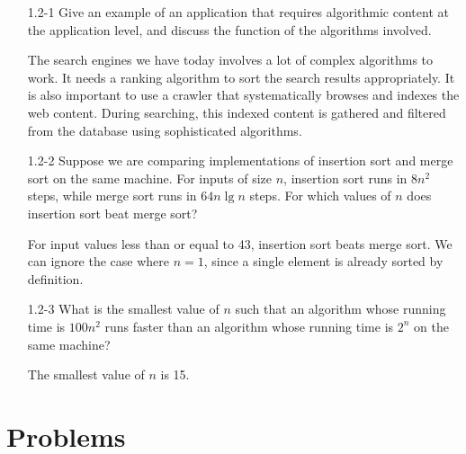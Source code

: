 \begin{enumerate}

\item[1.2{-}1] Give an example of an application that requires
  algorithmic content at the application level, and discuss the function of the
  algorithms involved.

\begin{framed}
The search engines we have today involves a lot of complex algorithms to work.
It needs a ranking algorithm to sort the search results appropriately. It is
also important to use a crawler that systematically browses and indexes the web
content. During searching, this indexed content is gathered and filtered from
the database using sophisticated algorithms.
\end{framed}

\item[1.2{-}2] Suppose we are comparing implementations of insertion
  sort and merge sort on the same machine. For inputs of size $n$, insertion sort
  runs in $8 n^2$ steps, while merge sort runs in $64 n \lg n$ steps. For which
  values of $n$ does insertion sort beat merge sort?

\begin{framed}
For input values less than or equal to 43, insertion sort beats merge sort. We
can ignore the case where $n = 1$, since a single element is already sorted by
definition.
\end{framed}

\item[1.2{-}3] What is the smallest value of $n$ such that an algorithm
  whose running time is $100 n^2$ runs faster than an algorithm whose running
  time is $2^n$ on the same machine?

\begin{framed}
The smallest value of $n$ is 15.
\end{framed}

\end{enumerate}

\pagebreak

\section*{Problems}
%

